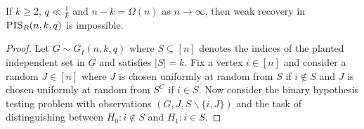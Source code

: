 \begin{theorem}
If $k \ge 2$, $q \ll \frac{1}{k}$ and $n - k = \Omega(n)$ as $n \to \infty$, then weak recovery in $\textsc{PIS}_R(n, k, q)$ is impossible.
\end{theorem}

\begin{proof}
Let $G \sim G_I(n, k, q)$ where $S \subseteq [n]$ denotes the indices of the planted independent set in $G$ and satisfies $|S| = k$. Fix a vertex $i \in [n]$ and consider a random $J \in [n]$ where $J$ is chosen uniformly at random from $S$ if $i \not \in S$ and $J$ is chosen uniformly at random from $S^C$ if $i \in S$. Now consider the binary hypothesis testing problem with observations $(G, J, S \backslash \{i, J\})$ and the task of distinguishing between $H_0 : i \not\in S$ and $H_1 : i \in S$.


\end{proof}
